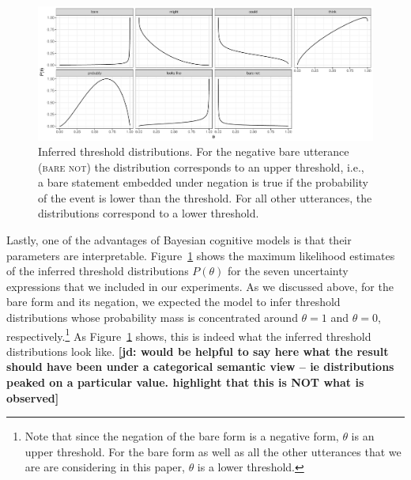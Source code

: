 \documentclass[lucida,biblatex]{sp} %
\newcommand{\jd}[1]{\textcolor{PinkyPurple}{\textbf{[jd: #1]}}}
\begin{document}
\begin{figure}
\includegraphics[width=\textwidth]{plots/threshold-distributions-prior.pdf}
\caption{Inferred threshold distributions. For the negative bare utterance (\textsc{bare not}) the distribution corresponds to an upper threshold, i.e., a bare statement embedded under negation is true if the probability of the event is lower than the threshold. For all other utterances, the distributions correspond to a lower threshold.
\label{fig:threshold-distributions}}
\end{figure}

Lastly, one of the advantages of Bayesian cognitive models is that their parameters are interpretable. Figure~\ref{fig:threshold-distributions} shows the 
maximum likelihood estimates of the inferred threshold distributions $P(\theta)$ for the seven uncertainty expressions that we included in our experiments.
As we discussed above, for the bare form and its negation, we expected the model to infer threshold distributions whose probability mass is concentrated 
around $\theta=1$ and $\theta=0$, respectively.\footnote{Note that since the negation of the bare form is a negative form, $\theta$ is an upper threshold. For the bare form as well as
all the other utterances that we are are considering in this paper, $\theta$ is a lower threshold.} As  Figure~\ref{fig:threshold-distributions} shows, this is indeed what
the inferred threshold distributions look like. \jd{would be helpful to say here what the result should have been under a categorical semantic view -- ie distributions peaked on a particular value. highlight that this is NOT what is observed}
\end{document}

